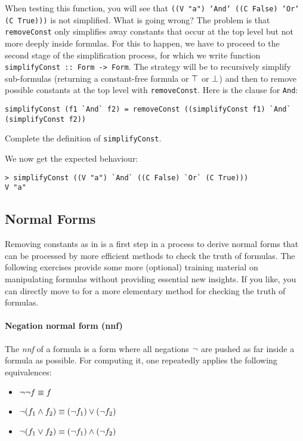 \documentclass[english]{article}
\begin{document}
When testing this function, you will see that \texttt{((V "a") `And` ((C
  False) `Or` (C True)))} is not simplified. What is going wrong? 
The problem is that \texttt{removeConst} only simplifies away constants that occur
at the top level but not more deeply inside formulas. For this to happen, we
have to proceed to the second stage of the simplification process, for which
we write function \texttt{simplifyConst :: Form -> Form}. The strategy will be
to recursively simplify sub-formulas (returning a constant-free formula or
$\top$ or $\perp$) and then to remove possible constants at the top level
with \texttt{removeConst}. Here is the clause for \texttt{And}:
\begin{lstlisting}
simplifyConst (f1 `And` f2) = removeConst ((simplifyConst f1) `And` (simplifyConst f2))
\end{lstlisting}


\begin{exo}\label{exo:simplifyConst}
Complete the definition of \texttt{simplifyConst}. 
\end{exo}

We now get the expected behaviour:
\begin{lstlisting}
> simplifyConst ((V "a") `And` ((C False) `Or` (C True)))
V "a"
\end{lstlisting}



\subsection{Normal Forms}\label{sec:normal_forms}

Removing constants as in  is a first step in a
process to derive normal forms that can be processed by more efficient methods
to check the truth of formulas. The following exercises
provide some more (optional) training material on manipulating formulas
without providing essential new insights. If you like, you can directly move to
 for a more elementary method for checking the truth of formulas.

\paragraph{Negation normal form (nnf)} The \emph{nnf} of a formula is a form
where all negations $\lnot$ are pushed as far inside a formula as possible. For
computing it, one
repeatedly applies the following equivalences:
\begin{itemize}
\item $\lnot \lnot f \equiv f$
\item $\lnot (f_1 \land f_2) \equiv (\lnot f_1) \lor (\lnot f_2)$
\item $\lnot (f_1 \lor f_2) \equiv (\lnot f_1) \land (\lnot f_2)$
\end{itemize}
\end{document}
